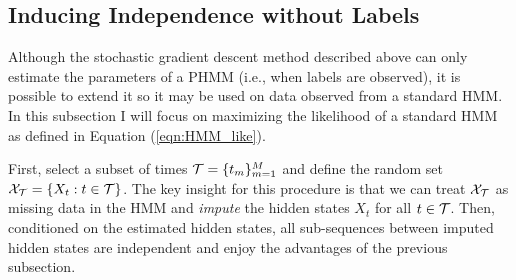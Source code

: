 \subsection{Inducing Independence without Labels}

Although the stochastic gradient descent method described above can only estimate the parameters of a PHMM (i.e., when labels are observed), it is possible to extend it so it may be used on data observed from a standard HMM. In this subsection I will focus on maximizing the likelihood of a standard HMM as defined in Equation (\ref{eqn:HMM_like}).

First, select a subset of times $\mathcal{T} = \{t_m\}_{m=1}^M$ and define the random set $\mathcal{X}_{\mathcal{T}} = \{X_t : t \in \mathcal{T}\}$. The key insight for this procedure is that we can treat $\mathcal{X}_{\mathcal{T}}$ as missing data in the HMM and \textit{impute} the hidden states $X_t$ for all $t \in \mathcal{T}$. %
Then, conditioned on the estimated hidden states, all sub-sequences between imputed hidden states are independent and enjoy the advantages of the previous subsection. 


